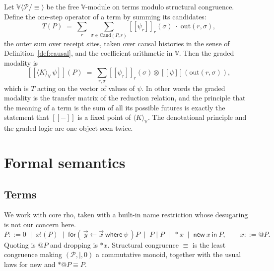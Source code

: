 \documentclass[11pt,a4paper]{article}
\theoremstyle{plain}
\theoremstyle{definition}
\theoremstyle{remark}
\newcommand{\sem}[1]{[\![#1]\!]}
\newcommand{\V}{\mathbb{V}}
\newcommand{\Proc}{\mathcal{P}}
\newcommand{\scong}{\equiv}
\newcommand{\tensorv}{\otimes}
\newcommand{\Cand}{\mathrm{Cand}}
\newcommand{\Out}{\mathrm{out}}
\begin{document}
Let $\V\langle \Proc/{\scong}\rangle$ be the free $\V$-module on terms modulo
structural congruence. Define the one-step operator of a term by summing its
candidates:
\begin{equation}\label{eq:onestep}
  T(P) \;=\; \sum_{r}\ \sum_{\sigma \in \Cand(P,r)}
    \sem{\psi_r}_r(\sigma)\;\cdot\;\Out(r,\sigma) ,
\end{equation}
the outer sum over receipt sites, taken over causal histories in the sense of
Definition~\ref{def:causal}, and the coefficient arithmetic in $\V$. Then the
graded modality is
\[
  \sem{\langle K \rangle_\V\,\psi}(P)
  \;=\; \sum_{r,\sigma} \sem{\psi_r}_r(\sigma) \tensorv \sem{\psi}(\Out(r,\sigma)),
\]
which is $T$ acting on the vector of values of $\psi$. In other words the graded
modality is the transfer matrix of the reduction relation, and the principle that
the meaning of a term is the sum of all its possible futures is exactly the
statement that $\sem{-}$ is a fixed point of $\langle K\rangle_\V$. The
denotational principle and the graded logic are one object seen twice.

\section{Formal semantics}\label{sec:semantics}

\subsection{Terms}

We work with core rho, taken with a built-in name restriction whose desugaring is
not our concern here.
\[
  P ::= 0 \;\mid\; x!(P) \;\mid\; \textsf{for}(\,\vec{y} \leftarrow \vec{x}
  \ \textsf{where}\ \psi\,)P \;\mid\; P \mid P \;\mid\; *x \;\mid\; \textsf{new}\ x\ \textsf{in}\ P,
  \qquad
  x ::= @P .
\]
Quoting is $@P$ and dropping is $*x$. Structural congruence $\scong$ is the least
congruence making $(\Proc, \mid, 0)$ a commutative monoid, together with the
usual laws for \textsf{new} and $*@P \scong P$.
\end{document}
